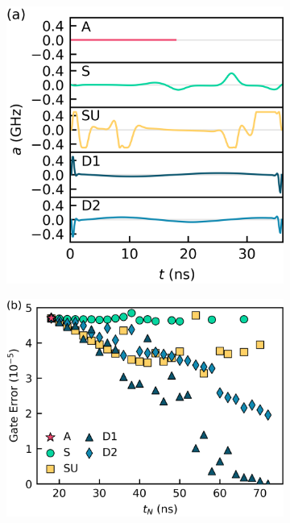 \begin{figure}[ht]
  \begin{subfigure}{.315\textwidth}
    \includegraphics[width=\linewidth]{assets/f2a.png}
    \caption{\label{fig:statica}}
  \end{subfigure}\hfill
  \begin{subfigure}{.4\textwidth}
    \includegraphics[width=\linewidth]{assets/f2b.png}

\end{subfigure}
\end{figure}
